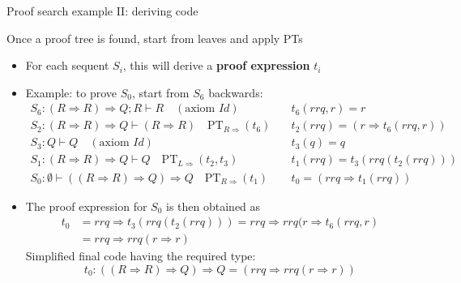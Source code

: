 \documentclass[english]{beamer}
\begin{document}
\begin{frame}{Proof search example II: deriving code}

Once a proof tree is found, start from leaves and apply PTs
\begin{itemize}
\item For each sequent $S_{i}$, this will derive a \textbf{proof expression}
$t_{i}$
\item Example: to prove $S_{0}$, start from $S_{6}$ backwards:{\footnotesize{}
\begin{align*}
S_{6}:\left(R\Rightarrow R\right)\Rightarrow Q;R\vdash R\quad(\text{axiom }Id)\quad & t_{6}(rrq,r)=r\\
S_{2}:\left(R\Rightarrow R\right)\Rightarrow Q\vdash\left(R\Rightarrow R\right)\quad\text{PT}_{R\Rightarrow}(t_{6})\quad & t_{2}(rrq)=\left(r\Rightarrow t_{6}(rrq,r)\right)\\
S_{3}:Q\vdash Q\quad(\text{axiom }Id)\quad & t_{3}(q)=q\\
S_{1}:\left(R\Rightarrow R\right)\Rightarrow Q\vdash Q\quad\text{PT}_{L\Rightarrow}(t_{2},t_{3})\quad & t_{1}(rrq)=t_{3}(rrq(t_{2}(rrq)))\\
S_{0}:\emptyset\vdash\left(\left(R\Rightarrow R\right)\Rightarrow Q\right)\Rightarrow Q\quad\text{PT}_{R\Rightarrow}(t_{1})\quad & t_{0}=\left(rrq\Rightarrow t_{1}(rrq)\right)
\end{align*}
}{\footnotesize \par}
\item The proof expression for $S_{0}$ is then obtained as
\begin{align*}
t_{0} & =rrq\Rightarrow t_{3}\left(rrq\left(t_{2}\left(rrq\right)\right)\right)=rrq\Rightarrow rrq(r\Rightarrow t_{6}\left(rrq,r\right)\\
 & =rrq\Rightarrow rrq\left(r\Rightarrow r\right)
\end{align*}
Simplified final code having the required type: 
\[
t_{0}:\left(\left(R\Rightarrow R\right)\Rightarrow Q\right)\Rightarrow Q=\left(rrq\Rightarrow rrq\left(r\Rightarrow r\right)\right)
\]
\end{itemize}
\end{frame}
\end{document}
